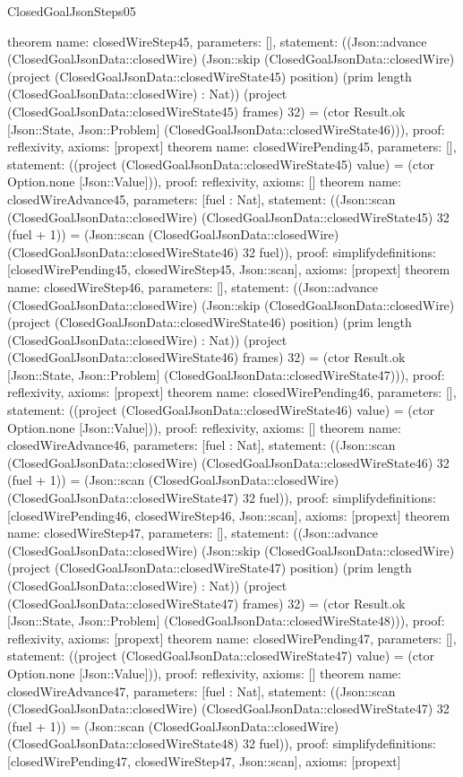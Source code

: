 \begin{lexlean}{ClosedGoalJsonSteps05}
\begin{semanticmodule}
{}
theorem{
 name: closedWireStep45, parameters: [],
 statement: ((Json::advance (ClosedGoalJsonData::closedWire) (Json::skip (ClosedGoalJsonData::closedWire) (project (ClosedGoalJsonData::closedWireState45) position) (prim length (ClosedGoalJsonData::closedWire) : Nat)) (project (ClosedGoalJsonData::closedWireState45) frames) 32) = (ctor Result.ok [Json::State, Json::Problem] (ClosedGoalJsonData::closedWireState46))), proof: reflexivity{}, axioms: [propext]
}
theorem{
 name: closedWirePending45, parameters: [],
 statement: ((project (ClosedGoalJsonData::closedWireState45) value) = (ctor Option.none [Json::Value])), proof: reflexivity{}, axioms: []
}
theorem{
 name: closedWireAdvance45, parameters: [fuel : Nat],
 statement: ((Json::scan (ClosedGoalJsonData::closedWire) (ClosedGoalJsonData::closedWireState45) 32 (fuel + 1)) = (Json::scan (ClosedGoalJsonData::closedWire) (ClosedGoalJsonData::closedWireState46) 32 fuel)), proof: simplify{definitions: [closedWirePending45, closedWireStep45, Json::scan]}, axioms: [propext]
}
theorem{
 name: closedWireStep46, parameters: [],
 statement: ((Json::advance (ClosedGoalJsonData::closedWire) (Json::skip (ClosedGoalJsonData::closedWire) (project (ClosedGoalJsonData::closedWireState46) position) (prim length (ClosedGoalJsonData::closedWire) : Nat)) (project (ClosedGoalJsonData::closedWireState46) frames) 32) = (ctor Result.ok [Json::State, Json::Problem] (ClosedGoalJsonData::closedWireState47))), proof: reflexivity{}, axioms: [propext]
}
theorem{
 name: closedWirePending46, parameters: [],
 statement: ((project (ClosedGoalJsonData::closedWireState46) value) = (ctor Option.none [Json::Value])), proof: reflexivity{}, axioms: []
}
theorem{
 name: closedWireAdvance46, parameters: [fuel : Nat],
 statement: ((Json::scan (ClosedGoalJsonData::closedWire) (ClosedGoalJsonData::closedWireState46) 32 (fuel + 1)) = (Json::scan (ClosedGoalJsonData::closedWire) (ClosedGoalJsonData::closedWireState47) 32 fuel)), proof: simplify{definitions: [closedWirePending46, closedWireStep46, Json::scan]}, axioms: [propext]
}
theorem{
 name: closedWireStep47, parameters: [],
 statement: ((Json::advance (ClosedGoalJsonData::closedWire) (Json::skip (ClosedGoalJsonData::closedWire) (project (ClosedGoalJsonData::closedWireState47) position) (prim length (ClosedGoalJsonData::closedWire) : Nat)) (project (ClosedGoalJsonData::closedWireState47) frames) 32) = (ctor Result.ok [Json::State, Json::Problem] (ClosedGoalJsonData::closedWireState48))), proof: reflexivity{}, axioms: [propext]
}
theorem{
 name: closedWirePending47, parameters: [],
 statement: ((project (ClosedGoalJsonData::closedWireState47) value) = (ctor Option.none [Json::Value])), proof: reflexivity{}, axioms: []
}
theorem{
 name: closedWireAdvance47, parameters: [fuel : Nat],
 statement: ((Json::scan (ClosedGoalJsonData::closedWire) (ClosedGoalJsonData::closedWireState47) 32 (fuel + 1)) = (Json::scan (ClosedGoalJsonData::closedWire) (ClosedGoalJsonData::closedWireState48) 32 fuel)), proof: simplify{definitions: [closedWirePending47, closedWireStep47, Json::scan]}, axioms: [propext]
}
\end{semanticmodule}
\end{lexlean}
